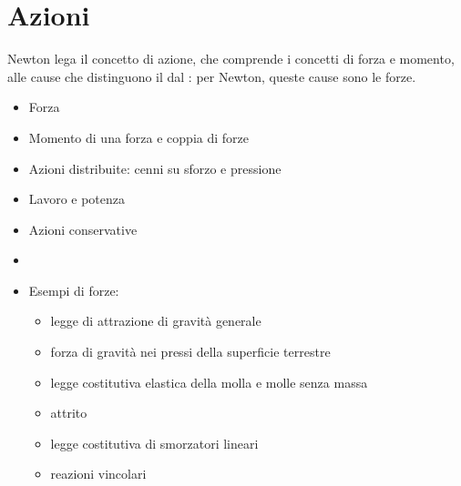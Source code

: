 \documentclass[letterpaper,10pt,english]{jupyterBook}
\begin{document}
\chapter{Azioni}
\label{\detokenize{ch/actions:azioni}}\label{\detokenize{ch/actions:classical-mechanics-actions}}\label{\detokenize{ch/actions::doc}}
\sphinxAtStartPar
{}
Newton lega il concetto di azione, che comprende i concetti di forza e momento, alle cause che distinguono il  dal : per Newton, queste cause sono le forze.

\sphinxAtStartPar
{}
\begin{itemize}
\item {} 
\sphinxAtStartPar
Forza

\item {} 
\sphinxAtStartPar
Momento di una forza e coppia di forze

\item {} 
\sphinxAtStartPar
Azioni distribuite: cenni su sforzo e pressione

\item {} 
\sphinxAtStartPar
Lavoro e potenza

\item {} 
\sphinxAtStartPar
Azioni conservative

\item {} 
\sphinxAtStartPar
{}

\item {} 
\sphinxAtStartPar
Esempi di forze:
\begin{itemize}
\item {} 
\sphinxAtStartPar
legge di attrazione di gravità generale

\item {} 
\sphinxAtStartPar
forza di gravità nei pressi della superficie terrestre

\item {} 
\sphinxAtStartPar
legge costitutiva elastica della molla e molle senza massa

\item {} 
\sphinxAtStartPar
attrito

\item {} 
\sphinxAtStartPar
legge costitutiva di smorzatori lineari

\item {} 
\sphinxAtStartPar
reazioni vincolari

\end{itemize}

\end{itemize}
\end{document}
